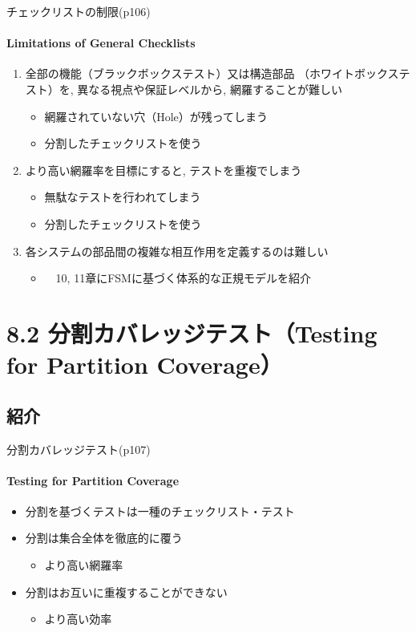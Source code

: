 \begin{frame}{チェックリストの制限(p106)}
\framesubtitle{Limitations of General Checklists}
\begin{enumerate}
\item 全部の機能（ブラックボックステスト）又は構造部品
（ホワイトボックステスト）を, 異なる視点や保証レベルから, 
網羅することが難しい
    \begin{itemize}
    \item 網羅されていない穴（Hole）が残ってしまう
    \item<uncover@3-|alert@3> 分割したチェックリストを使う
    \end{itemize}
\item より高い網羅率を目標にすると, テストを重複でしまう
    \begin{itemize}
    \item 無駄なテストを行われてしまう
    \item<uncover@3-|alert@3> 分割したチェックリストを使う
    \end{itemize}
\item 各システムの部品間の複雑な相互作用を定義するのは難しい
    \begin{itemize}
    \item<uncover@2-|alert@2>　10, 11章にFSMに基づく体系的な正規モデルを紹介
     
    \end{itemize}
\end{enumerate}
\end{frame}
\section{8.2 分割カバレッジテスト（Testing for Partition Coverage）}
\subsection{紹介}
\begin{frame}{分割カバレッジテスト(p107)}
\framesubtitle{Testing for Partition Coverage}
\begin{itemize}
\item 分割を基づくテストは一種のチェックリスト・テスト
\item 分割は集合全体を徹底的に覆う　 
    \begin{itemize}
    \item より高い\alert{網羅率}
    \end{itemize}
\item 分割はお互いに重複することができない
    \begin{itemize}
    \item より高い\alert{効率}
    \end{itemize}
\end{itemize}
\end{frame}
